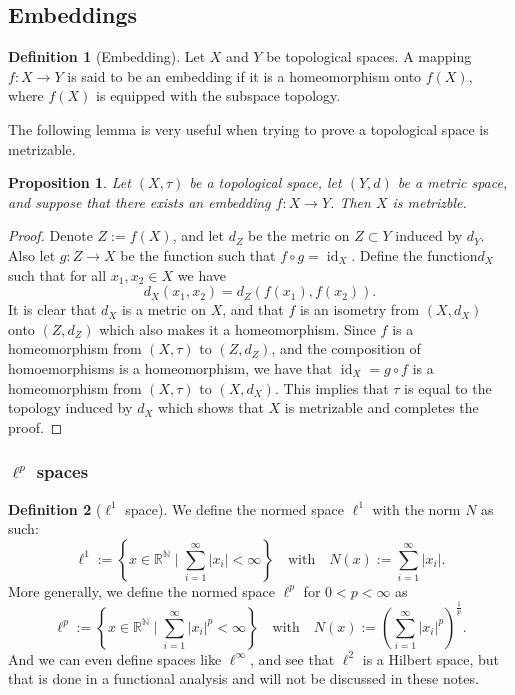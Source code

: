\documentclass[11pt,a4paper]{article}
\theoremstyle{definition}
\newtheorem{definition}{Definition}[section]
\theoremstyle{plain}
\newtheorem{proposition}[theorem]{Proposition}
\DeclareMathOperator{\id}{id}
\newcommand{\N}{\mathbb{N}}
\newcommand{\R}{\mathbb{R}}
\newcommand{\set}[2]{ \left\{ #1 \mid #2 \right\} }
\newcommand{\abs}[1]{\left\lvert #1\right\rvert}
\begin{document}
  \subsection{Embeddings}

  \begin{definition}[Embedding]
      Let $X$ and $Y$ be topological spaces. A mapping $f \colon X \to Y$
      is said to be an embedding if it is a homeomorphism onto $f(X)$,
      where $f(X)$ is equipped with the subspace topology.
  \end{definition}

  The following lemma is very useful when trying to prove a topological space
  is metrizable.

  \begin{proposition}
    Let $(X, \tau)$ be a topological space, let $(Y, d)$ be a metric space,
    and suppose that there exists an embedding $f \colon X \to Y$.
    Then $X$ is metrizble.
  \end{proposition}
  \begin{proof}
    Denote $Z := f(X)$, and let $d_Z$ be the metric on $Z \subset Y$ induced
    by $d_Y$. Also let $g \colon Z \to X$ be the function such that
    $f \circ g = \id_X$. Define the function$d_X$ such that for all 
    $x_1, x_2 \in X$ we have
    \[
      d_X(x_1, x_2) = d_Z(f(x_1), f(x_2)).
    \]
    It is clear that $d_X$ is a metric on $X$, and that $f$ is an isometry
    from $(X,d_X)$ onto $(Z,d_Z)$ which also makes it a homeomorphism.
    Since $f$ is a homeomorphism from $(X, \tau)$ to $(Z, d_Z)$, and
    the composition of homoemorphisms is a homeomorphism, we have that
    $\id_X = g \circ f$ is a homeomorphism from $(X, \tau)$ to $(X, d_X)$.
    This implies that $\tau$ is equal to the topology induced by $d_X$
    which shows that $X$ is metrizable and completes the proof.
  \end{proof}
  
  \subsubsection{\texorpdfstring{$\ell^p$}{l} spaces}

  \begin{definition}[$\ell^1$ space]
    We define the normed space $\ell^1$ with the norm $N$ as such:
    \[
      \ell^1 := \set{x \in \R^{\N}}{\sum_{i=1}^{\infty} \abs{x_i} < \infty}
      \quad \text{with} \quad
      N(x) := \sum_{i=1}^{\infty} \abs{x_i}.
    \]
    More generally, we define the normed space $\ell^p$ for $0 < p < \infty$ as
    \[
      \ell^p := \set{x \in \R^{\N}}{\sum_{i=1}^{\infty} \abs{x_i}^p < \infty}
      \quad \text{with} \quad
      N(x) := \left(\sum_{i=1}^{\infty} \abs{x_i}^p\right)^{\frac{1}{p}}.
    \]
    And we can even define spaces like $\ell^{\infty}$, and see that
    $\ell^2$ is a Hilbert space, but that is done in a functional analysis
    and will not be discussed in these notes.
  \end{definition}
\end{document}
